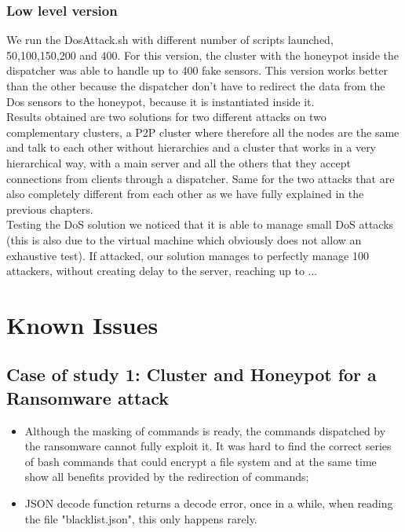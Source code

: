 \subsubsection{Low level version} 
We run the DosAttack.sh with different number of scripts launched, 50,100,150,200 and 400. For this version, the cluster with the honeypot inside the dispatcher was able to handle up to 400 fake sensors. 
This version works better than the other because the dispatcher don't have to redirect the data from the Dos sensors to the honeypot, because it is instantiated inside it.\\
Results obtained are two solutions for two different attacks on two complementary clusters, a P2P cluster where therefore all the nodes are the same and talk to each other without hierarchies and a cluster that works in a very hierarchical way, with a main server and all the others that they accept connections from clients through a dispatcher.
Same for the two attacks that are also completely different from each other as we have fully explained in the previous chapters.\\
Testing the DoS solution we noticed that it is able to manage small DoS attacks (this is also due to the virtual machine which obviously does not allow an exhaustive test). If attacked, our solution manages to perfectly manage 100 attackers, without creating delay to the server, reaching up to ...

\section{Known Issues}

\subsection{Case of study 1: Cluster and Honeypot for a Ransomware attack}

\begin{itemize}
    \item Although the masking of commands is ready, the commands dispatched by the ransomware cannot fully exploit it. It was hard to find the correct series of bash commands that could encrypt a file system and at the same time show all benefits provided by the redirection of commands;
    \item JSON decode function returns a decode error, once in a while, when reading the file "blacklist.json", this only happens rarely.
\end{itemize}

